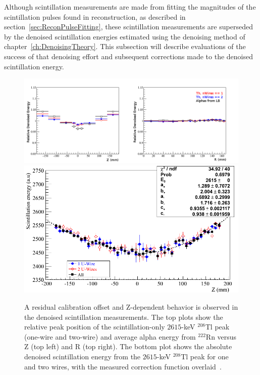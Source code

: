 Although scintillation measurements are made from fitting the magnitudes of the scintillation pulses found in reconstruction, as described in section~\ref{sec:ReconPulseFitting}, these scintillation measurements are superseded by the denoised scintillation energies estimated using the denoising method of chapter~\ref{ch:DenoisingTheory}.  This subsection will describe evaluations of the success of that denoising effort and subsequent corrections made to the denoised scintillation energy.

\begin{figure}
\begin{center}
\includegraphics[keepaspectratio=true,width=\textwidth,clip=true,trim=0mm 0mm 20mm 0mm]{DenoisedScintillatonRelativeRZBias.png}
\includegraphics[keepaspectratio=true,width=\textwidth]{DenoisedScintillatonZBias.png}
\end{center}
\renewcommand{\baselinestretch}{1}
\small\normalsize
\begin{quote}
\caption{A residual calibration offset and Z-dependent behavior is observed in the denoised scintillation measurements.  The top plots show the relative peak position of the scintillation-only $2615$-keV $^{208}$Tl peak (one-wire and two-wire) and average alpha energy from $^{222}$Rn versus Z (top left) and R (top right).  The bottom plot shows the absolute denoised scintillation energy from the $2615$-keV $^{208}$Tl peak for one and two wires, with the measured correction function overlaid~\cite{EnergyDocumentRun2ab}.}
\label{fig:ResidualLightZBias}
\end{quote}
\end{figure}
\renewcommand{\baselinestretch}{2}
\small\normalsize

